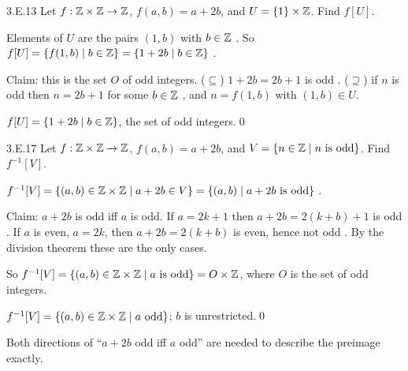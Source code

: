 \begin{bookex}[essential]{3.E.13}
Let $f:\mathbb{Z}\times\mathbb{Z}\to\mathbb{Z}$, $f(a,b)=a+2b$, and $U=\{1\}\times\mathbb{Z}$. Find $f[U]$.
\solution
\begin{steps}
\item Elements of $U$ are the pairs $(1,b)$ with $b\in\mathbb{Z}$ . So $f[U]=\{f(1,b)\mid b\in\mathbb{Z}\}=\{1+2b\mid b\in\mathbb{Z}\}$ .
\item Claim: this is the set $O$ of odd integers. ($\subseteq$) $1+2b=2b+1$ is odd . ($\supseteq$) if $n$ is odd then $n=2b+1$ for some $b\in\mathbb{Z}$ , and $n=f(1,b)$ with $(1,b)\in U$.
\end{steps}
\answer $f[U]=\{1+2b\mid b\in\mathbb{Z}\}$, the set of odd integers.\qed
\end{bookex}

\begin{bookex}[essential]{3.E.17}
Let $f:\mathbb{Z}\times\mathbb{Z}\to\mathbb{Z}$, $f(a,b)=a+2b$, and $V=\{n\in\mathbb{Z}\mid n\text{ is odd}\}$. Find $f^{-1}[V]$.
\solution
\begin{steps}
\item $f^{-1}[V]=\{(a,b)\in\mathbb{Z}\times\mathbb{Z}\mid a+2b\in V\}=\{(a,b)\mid a+2b\text{ is odd}\}$ .
\item Claim: $a+2b$ is odd iff $a$ is odd. If $a=2k+1$ then $a+2b=2(k+b)+1$ is odd . If $a$ is even, $a=2k$, then $a+2b=2(k+b)$ is even, hence not odd . By the division theorem these are the only cases.
\item So $f^{-1}[V]=\{(a,b)\in\mathbb{Z}\times\mathbb{Z}\mid a\text{ is odd}\}=O\times\mathbb{Z}$, where $O$ is the set of odd integers.
\end{steps}
\answer $f^{-1}[V]=\{(a,b)\in\mathbb{Z}\times\mathbb{Z}\mid a\text{ odd}\}$; $b$ is unrestricted.\qed
\begin{compare}
\item Both directions of ``$a+2b$ odd iff $a$ odd'' are needed to describe the preimage exactly.
\end{compare}
\end{bookex}

